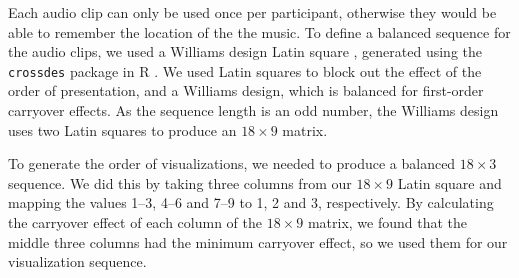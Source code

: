 Each audio clip can only be used once per participant, otherwise they would be able to remember the location of the the
music. To define a balanced sequence for the audio clips, we used a Williams design Latin square \citep{Williams1949},
generated using the \texttt{crossdes} package in R \citep{Sailer2013}. We used Latin squares to block out the effect of
the order of presentation, and a Williams design, which is balanced for first-order carryover effects.  As the sequence
length is an odd number, the Williams design uses two Latin squares to produce an $18\times9$ matrix.

To generate the order of visualizations, we needed to produce a balanced $18\times3$ sequence. We did this by taking
three columns from our $18\times9$ Latin square and mapping the values 1--3, 4--6 and 7--9 to 1, 2 and 3, respectively.
By calculating the carryover effect of each column of the $18\times9$ matrix, we found that the middle three columns
had the minimum carryover effect, so we used them for our visualization sequence.

